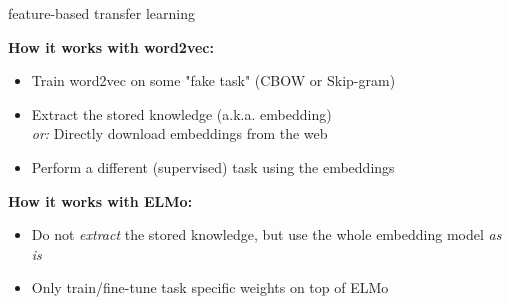 \documentclass[11pt,compress,t,notes=noshow, xcolor=table]{beamer}
\begin{document}


\begin{frame}{feature-based transfer learning}

\vfill

	\textbf{How it works with word2vec:}
	
	\begin{itemize}
		\item Train word2vec on some "fake task" (CBOW or Skip-gram)
		\item Extract the stored knowledge (a.k.a. embedding)\\
					\textit{or:} Directly download embeddings from the web 
		\item Perform a different (supervised) task using the embeddings
	\end{itemize}
	
	\vspace{.3cm}
	
	\textbf{How it works with ELMo:}
	
	\begin{itemize}
		\item Do not \textit{extract} the stored knowledge, but use the whole embedding model \textit{as is}
		\item Only train/fine-tune task specific weights on top of ELMo
	\end{itemize}
	
\vfill

\end{frame}

\end{document}
